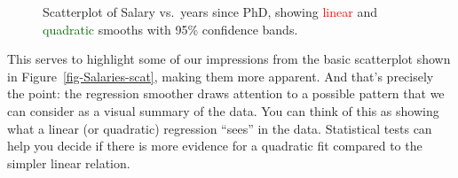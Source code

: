 \documentclass[
  letterpaper,
  10pt,
  krantz2]{krantz}
\begin{document}
\begin{figure}[H]


\caption{\label{fig-Salaries-lm}Scatterplot of Salary vs.~years since
PhD, showing \textcolor{red}{linear} and
\textcolor{darkgreen}{quadratic} smooths with 95\% confidence bands.}

\end{figure}%

This serves to highlight some of our impressions from the basic
scatterplot shown in Figure~\ref{fig-Salaries-scat}, making them more
apparent. And that's precisely the point: the regression smoother draws
attention to a possible pattern that we can consider as a visual summary
of the data. You can think of this as showing what a linear (or
quadratic) regression ``sees'' in the data. Statistical tests can help
you decide if there is more evidence for a quadratic fit compared to the
simpler linear relation.
\end{document}
